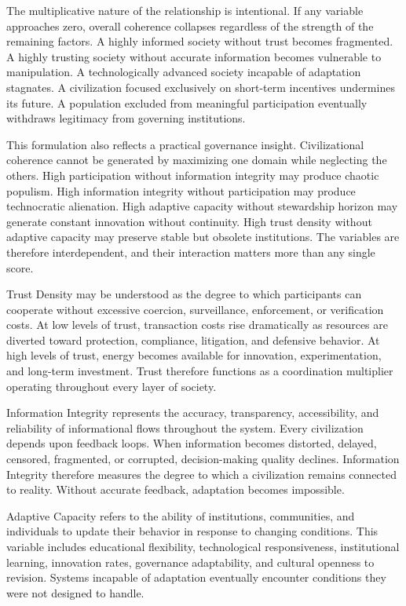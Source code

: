 \documentclass[12pt]{article}
\begin{document}
The multiplicative nature of the relationship is intentional. If any variable approaches zero, overall coherence collapses regardless of the strength of the remaining factors. A highly informed society without trust becomes fragmented. A highly trusting society without accurate information becomes vulnerable to manipulation. A technologically advanced society incapable of adaptation stagnates. A civilization focused exclusively on short-term incentives undermines its future. A population excluded from meaningful participation eventually withdraws legitimacy from governing institutions.

This formulation also reflects a practical governance insight. Civilizational coherence cannot be generated by maximizing one domain while neglecting the others. High participation without information integrity may produce chaotic populism. High information integrity without participation may produce technocratic alienation. High adaptive capacity without stewardship horizon may generate constant innovation without continuity. High trust density without adaptive capacity may preserve stable but obsolete institutions. The variables are therefore interdependent, and their interaction matters more than any single score.

Trust Density may be understood as the degree to which participants can cooperate without excessive coercion, surveillance, enforcement, or verification costs. At low levels of trust, transaction costs rise dramatically as resources are diverted toward protection, compliance, litigation, and defensive behavior. At high levels of trust, energy becomes available for innovation, experimentation, and long-term investment. Trust therefore functions as a coordination multiplier operating throughout every layer of society.

Information Integrity represents the accuracy, transparency, accessibility, and reliability of informational flows throughout the system. Every civilization depends upon feedback loops. When information becomes distorted, delayed, censored, fragmented, or corrupted, decision-making quality declines. Information Integrity therefore measures the degree to which a civilization remains connected to reality. Without accurate feedback, adaptation becomes impossible.

Adaptive Capacity refers to the ability of institutions, communities, and individuals to update their behavior in response to changing conditions. This variable includes educational flexibility, technological responsiveness, institutional learning, innovation rates, governance adaptability, and cultural openness to revision. Systems incapable of adaptation eventually encounter conditions they were not designed to handle.
\end{document}
